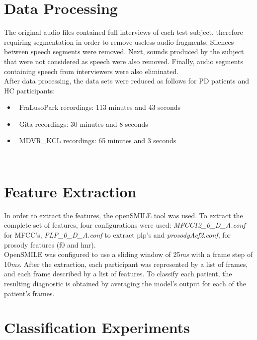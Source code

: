 \section{Data Processing}

The original audio files contained full interviews of each test subject, therefore requiring segmentation in order to remove useless audio fragments. Silences between speech segments were removed. Next, sounds produced by the subject that were not considered as speech were also removed. Finally, audio segments containing speech from interviewers were also eliminated.
\\
After data processing, the data sets were reduced as follows for PD patients and HC participants:

\begin{itemize}
	\item ~FraLusoPark recordings: 113 minutes and 43 seconds
	\item ~Gita recordings: 30 minutes and 8 seconds
	\item ~MDVR\_KCL recordings: 65 minutes and 3 seconds
	
\end{itemize}\\
\section{Feature Extraction}

In order to extract the features, the openSMILE \cite{openSMILE} tool was used. To extract the complete set of features, four configurations were used: \textit{MFCC12\_0\_D\_A.conf} for MFCC's, \textit{PLP\_0\_D\_A.conf} to extract \gls{plp}'s and \textit{prosodyAcf2.conf}, for prosody features (\gls{f0} and \gls{hnr}).
\\
OpenSMILE was configured to use a sliding window of 25\textit{ms} with a frame step of 10\textit{ms}. After the extraction, each participant was represented by a list of frames, and each frame described by a list of features. To classify each patient, the resulting diagnostic is obtained by averaging the model's output for each of the patient's frames.

\section{Classification Experiments}

